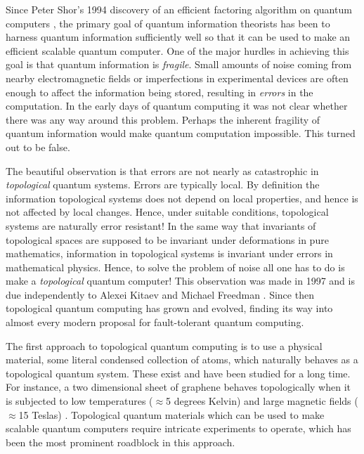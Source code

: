 Since Peter Shor’s 1994 discovery of an efficient factoring algorithm on quantum computers \cite{shor1994algorithms}, the primary goal of quantum information theorists has been to harness quantum information sufficiently well so that it can be used to make an efficient scalable quantum computer. One of the major hurdles in achieving this goal is that quantum information is {\em fragile}. Small amounts of noise coming from nearby electromagnetic fields or imperfections in experimental devices are often enough to affect the information being stored, resulting in \textit{errors} in the computation. In the early days of quantum computing it was not clear whether there was any way around this problem. Perhaps the inherent fragility of quantum information would make quantum computation impossible. This turned out to be false.

The beautiful observation is that errors are not nearly as catastrophic in {\em topological} quantum systems. Errors are typically local. By definition the information topological systems does not depend on local properties, and hence is not affected by local changes. Hence, under suitable conditions, topological systems are naturally error resistant! In the same way that invariants of topological spaces are supposed to be invariant under deformations in pure mathematics, information in topological systems is invariant under errors in mathematical physics. Hence, to solve the problem of noise all one has to do is make a {\em topological} quantum computer! This observation was made in 1997 and is due independently to Alexei Kitaev and Michael Freedman \cite{kitaev2003fault, freedman1998p}. Since then topological quantum computing has grown and evolved, finding its way into almost every modern proposal for fault-tolerant quantum computing.

The first approach to topological quantum computing is to use a physical material, some literal condensed collection of atoms, which naturally behaves as a topological quantum system. These exist and have been studied for a long time. For instance, a two dimensional sheet of graphene behaves topologically when it is subjected to low temperatures ($\approx$5 degrees Kelvin) and large magnetic fields ($\approx$15 Teslas) \cite{bolotin2009observation}. Topological quantum materials which can be used to make scalable quantum computers require intricate experiments to operate, which has been the most prominent roadblock in this approach.

